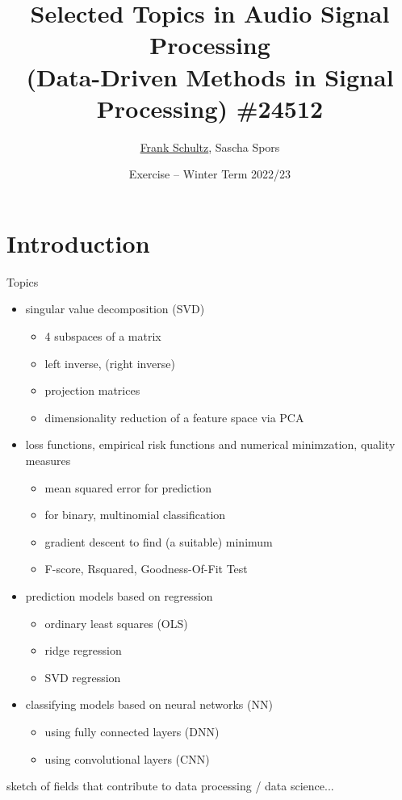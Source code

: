 \documentclass[mathserif, aspectratio=43]{intbeamer}
\title[STiASP \#24512 - Exercise]%
{Selected Topics in Audio Signal Processing\\(Data-Driven Methods in Signal Processing) \#24512}
\author[Schultz, Spors]{%
    \underline{Frank Schultz}, Sascha Spors}
\date[Winter Term 2022/23]{%
  Exercise -- Winter Term 2022/23}
\institute[]{Research Group Signal Processing and Virtual Acoustics,
University of Rostock}
\begin{document}
\maketitle
%
%
%

%
%
%
\section{Introduction}
\begin{frame}{Topics}
\begin{itemize}
\item singular value decomposition (SVD)
  \begin{itemize}
  \item 4 subspaces of a matrix
  \item left inverse, (right inverse)
  \item projection matrices
  \item dimensionality reduction of a feature space via PCA
  \end{itemize}
\item loss functions, empirical risk functions and numerical minimzation, quality measures
\begin{itemize}
\item mean squared error for prediction
\item for binary, multinomial classification
\item gradient descent to find (a suitable) minimum
\item F-score, Rsquared, Goodness-Of-Fit Test
\end{itemize}
\item prediction models based on regression
    \begin{itemize}
    \item ordinary least squares (OLS)
    \item ridge regression
    \item SVD regression
    \end{itemize}
\item classifying models based on neural networks (NN)
  \begin{itemize}
  \item using fully connected layers (DNN)
  \item using convolutional layers (CNN)
  \end{itemize}
\end{itemize}
sketch of fields that contribute to data processing / data science...
\end{frame}
\end{document}
